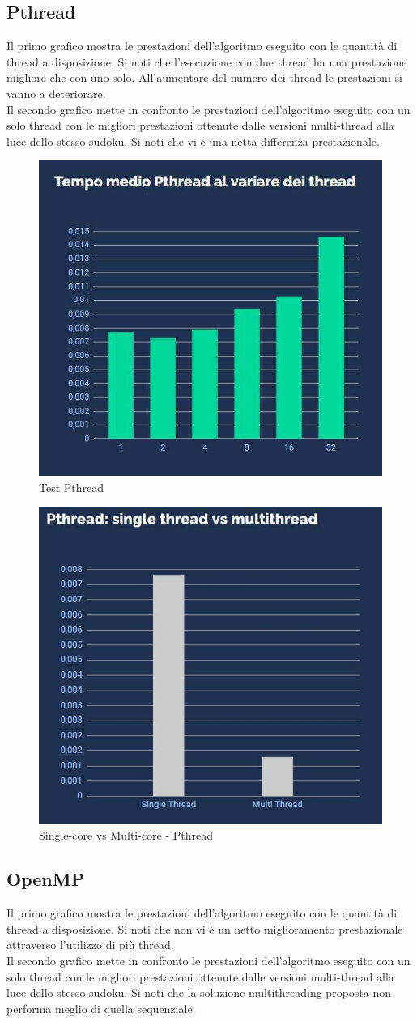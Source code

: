 \documentclass[twoside,twocolumn]{article}
\begin{document}
\subsection{Pthread}
Il primo grafico mostra le prestazioni dell'algoritmo eseguito con le quantità di thread a disposizione. Si noti che l'esecuzione con due thread ha una prestazione migliore che con uno solo. All'aumentare del numero dei thread le prestazioni si vanno a deteriorare. 
\\\indent Il secondo grafico mette in confronto le prestazioni dell'algoritmo eseguito con un solo thread con le migliori prestazioni ottenute dalle versioni multi-thread alla luce dello stesso sudoku. Si noti che vi è una netta differenza prestazionale.

\begin{figure}[htp]
\begin{center}
\includegraphics[width=0.4 \textwidth]{Test Pthread.png}
\caption{Test Pthread}
\end{center}
\end{figure}

\begin{figure}[htp]
\begin{center}
\includegraphics[width=0.4 \textwidth]{Pthread single vs multi.png}
\caption{Single-core vs Multi-core - Pthread}
\end{center}
\end{figure}

\subsection{OpenMP}
Il primo grafico mostra le prestazioni dell'algoritmo eseguito con le quantità di thread a disposizione. Si noti che non vi è un netto miglioramento prestazionale attraverso l'utilizzo di più thread.
\\\indent Il secondo grafico mette in confronto le prestazioni dell'algoritmo eseguito con un solo thread con le migliori prestazioni ottenute dalle versioni multi-thread alla luce dello stesso sudoku. Si noti che la soluzione multithreading proposta non performa meglio di quella sequenziale.
\end{document}
